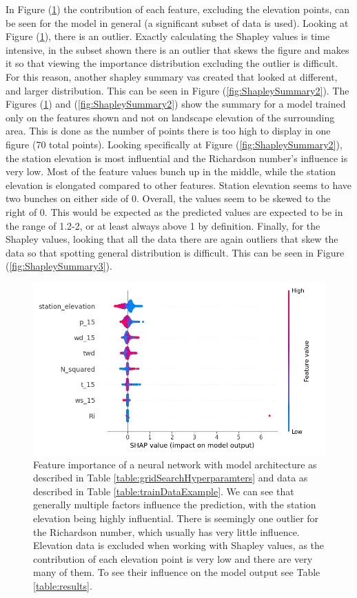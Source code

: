 In Figure (\ref{fig:ShapleySummary}) the contribution of each feature, excluding the elevation points, can be seen for the model in general (a significant subset of data is used). Looking at Figure (\ref{fig:ShapleySummary}), there is an outlier. Exactly calculating the Shapley values is time intensive, in the subset shown there is an outlier that skews the figure and makes it so that viewing the importance distribution excluding the outlier is difficult. For this reason, another shapley summary vas created that looked at different, and larger distribution. This can be seen in Figure (\ref{fig:ShapleySummary2}). The Figures (\ref{fig:ShapleySummary}) and (\ref{fig:ShapleySummary2}) show the summary for a model trained only on the features shown and not on landscape elevation of the surrounding area. This is done as the number of points there is too high to display in one figure (70 total points). Looking specifically at Figure (\ref{fig:ShapleySummary2}), the station elevation is most influential and the Richardson number's influence is very low. Most of the feature values bunch up in the middle, while the station elevation is elongated compared to other features. Station elevation seems to have two bunches on either side of 0. Overall, the values seem to be skewed to the right of 0. This would be expected as the predicted values are expected to be in the range of 1.2-2, or at least always above 1 by definition. Finally, for the Shapley values, looking that all the data there are again outliers that skew the data so that spotting general distribution is difficult. This can be seen in Figure (\ref{fig:ShapleySummary3}).

\begin{figure}
    \centering
    \includegraphics[scale = 0.6]{Figures/shap_plots/summary_plot.png}
    \caption[Summary feature importance of a neural network.]{Feature importance of a neural network with model architecture as described in Table \ref{table:gridSearchHyperparamters} and data as described in Table \ref{table:trainDataExample}. We can see that generally multiple factors influence the prediction, with the station elevation being highly influential. There is seemingly one outlier for the Richardson number, which usually has very little influence. Elevation data is excluded when working with Shapley values, as the contribution of each elevation point is very low and there are very many of them. To see their influence on the model output see Table \ref{table:results}.}
    \label{fig:ShapleySummary}
\end{figure}

